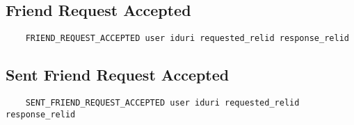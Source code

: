 \documentclass[letterpaper,11pt,oneside]{article}
\begin{document}
\subsection{Friend Request Accepted}

\vspace{10pt}
\begin{verbatim}
    FRIEND_REQUEST_ACCEPTED user iduri requested_relid response_relid
\end{verbatim}
\vspace{10pt}

\subsection{Sent Friend Request Accepted}

\vspace{10pt}
\begin{verbatim}
    SENT_FRIEND_REQUEST_ACCEPTED user iduri requested_relid response_relid
\end{verbatim}
\vspace{10pt}
\end{document}
